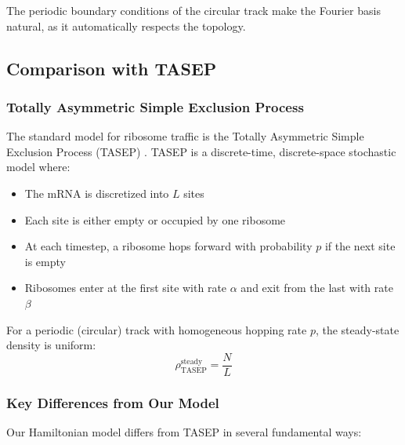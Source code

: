 \documentclass[11pt]{article}
\begin{document}
The periodic boundary conditions of the circular track make the Fourier basis natural, as it automatically respects the topology.

\subsection{Comparison with TASEP}

\subsubsection{Totally Asymmetric Simple Exclusion Process}

The standard model for ribosome traffic is the Totally Asymmetric Simple Exclusion Process (TASEP) \cite{macdonald1968kinetics, shaw2003totally}. TASEP is a discrete-time, discrete-space stochastic model where:
\begin{itemize}[nosep]
    \item The mRNA is discretized into $L$ sites
    \item Each site is either empty or occupied by one ribosome
    \item At each timestep, a ribosome hops forward with probability $p$ if the next site is empty
    \item Ribosomes enter at the first site with rate $\alpha$ and exit from the last with rate $\beta$
\end{itemize}

For a periodic (circular) track with homogeneous hopping rate $p$, the steady-state density is uniform:
\begin{equation}
    \rho_{\text{TASEP}}^{\text{steady}} = \frac{N}{L}
\end{equation}

\subsubsection{Key Differences from Our Model}

Our Hamiltonian model differs from TASEP in several fundamental ways:
\end{document}
